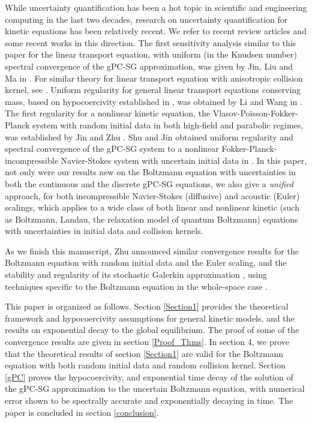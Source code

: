 \documentclass[final,onefignum,onetabnum]{siamart171218}
\begin{document}
While uncertainty quantification has been a hot topic in scientific and engineering computing in the last two decades,
research on uncertainty quantification for kinetic equations has been relatively recent. We refer to recent review articles \cite{HuReview, DPZ} and
some recent works \cite{XZJ, Hu, DesPer, Jin-Liu, Ma, Mu-Liu, QinWang, Liu, Jin-Lu, Zhu, Rui1, Rui, APZ} in this direction. The first sensitivity analysis similar
to this paper for the linear
transport equation, with uniform (in the Knudsen number) spectral convergence
of the gPC-SG approximation, was given by Jin, Liu and Ma in \cite{Ma}.
For similar theory for linear transport equation with anisotropic
collision kernel, see \cite{Jin-Liu, Liu}. Uniform regularity for general
linear transport equations conserving mass, based on hypocoercivity
established in \cite{DMS},
was obtained by Li and Wang in \cite{QinWang}. The first regularity
for a nonlinear kinetic equation, the Vlasov-Poisson-Fokker-Planck system
with random initial data in both high-field and parabolic regimes, was established by Jin and Zhu \cite{Zhu}.
Shu and Jin obtained uniform regularity and spectral convergence of the gPC-SG
system to a nonlinear Fokker-Planck-incompressible Navier-Stokes
system with uncertain initial data in \cite{Rui}.  In this paper, not only
were our results new on the Boltzmann equation with uncertainties in both
the continuous and the discrete gPC-SG equations, we also give
a {\it unified} approach,
for both incompressible Navier-Stokes (diffusive) and acoustic
(Euler) scalings, which applies to a wide class of  both linear and nonlinear
kinetic (such as Boltzmann, Landau, the relaxation model of quantum Boltzmann)
equations with uncertainties in initial data and collision kernels.

As we finish this manuscript, Zhu announced similar convergence results for the Boltzmann equation with random initial data and the Euler scaling,
and the stability and regularity of its stochastic Galerkin approximation
\cite{Zhu-B}, using techniques specific to the Boltzmann equation in the whole-space case \cite{Guo-whole, Duan}. 

This paper is organized as follows. Section \ref{Section1} provides
the theoretical framework and  hypocoercivity assumptions for general kinetic models, and the results on exponential decay to the global equilibrium. The proof of some of the convergence results are given in section \ref{Proof_Thms}. 
In section 4, we prove that the theoretical results of
section \ref{Section1} are valid for the Boltzmann equation with both
random initial data and random collision kernel. 
Section \ref{gPC} proves the hypocoercivity, and exponential time decay of the solution of the gPC-SG approximation to the uncertain Boltzmann equation,
with numerical  error shown to be spectrally accurate and exponentially decaying in time. The paper is concluded in section \ref{conclusion}.
\end{document}
